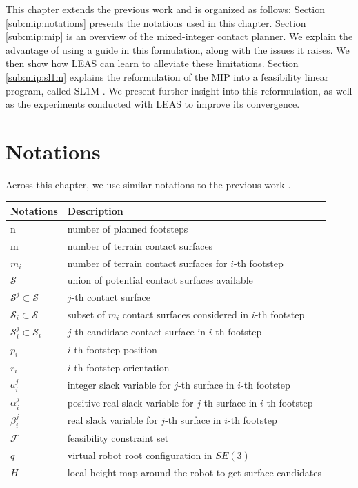This chapter extends the previous work \cite{sl1m_v2} and is organized as follows:
Section \ref{sub:mip:notations} presents the notations used in this chapter.
Section \ref{sub:mip:mip} is an overview of the mixed-integer contact planner.
We explain the advantage of using a guide in this formulation, along with the issues it raises. 
We then show how LEAS can learn to alleviate these limitations.
Section \ref{sub:mip:sl1m} explains the reformulation of the MIP into a feasibility linear program, called SL1M \cite{sl1m_v1}. 
We present further insight into this reformulation, as well as the experiments conducted with LEAS to improve its convergence.

\section{Notations\label{sub:mip:notations}}
Across this chapter, we use similar notations to the previous work \cite{sl1m_v2}.
\begin{center}
\begin{tabular}{ l l } 
    \hline
    \textbf{Notations} & \textbf{Description} \\ 
    \hline
    n                  & number of planned footsteps \\ 
    m                  & number of terrain contact surfaces \\ 
    $m_i$                & number of terrain contact surfaces for $i$-th footstep \\
    $\mathcal{S}$      & union of potential contact surfaces available \\
    $\mathcal{S}^j \subset \mathcal{S}$     & $j$-th contact surface \\
    $\mathcal{S}_i \subset \mathcal{S}$     & subset of $m_i$ contact surfaces considered in $i$-th footstep \\ 
    $\mathcal{S}_i^j \subset \mathcal{S}_i$ & $j$-th candidate contact surface in $i$-th footstep \\ 
    $p_i$              & $i$-th footstep position\\ 
    $r_i$              & $i$-th footstep orientation\\
    $a_i^j$            & integer slack variable for $j$-th surface in $i$-th footstep \\ 
    $\alpha_i^j$       & positive real slack variable for $j$-th surface in $i$-th footstep \\ 
    $\beta_i^j$        & real slack variable for $j$-th surface in $i$-th footstep \\
    $\mathcal{F}$      & feasibility constraint set \\
    $q$              & virtual robot root configuration in $SE(3)$\\
    $H$              & local height map around the robot to get surface candidates\\
    \hline
\end{tabular}
\end{center}

